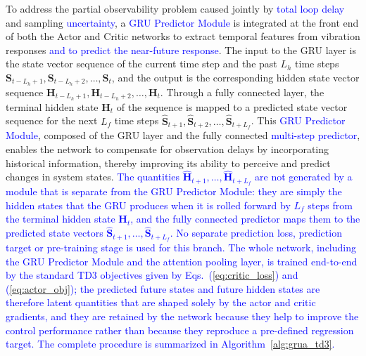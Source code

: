 \documentclass[review]{elsarticle}
\begin{document}
To address the partial observability problem caused jointly by \textcolor{blue}{total loop delay} and sampling \textcolor{blue}{uncertainty}, a \textcolor{blue}{GRU Predictor Module} is integrated at the front end of both the Actor and Critic networks to extract temporal features from vibration responses \textcolor{blue}{and to predict the near-future response}.
The input to the GRU layer is the state vector sequence of the current time step and the past $L_h$ time steps $\mathbf{S}_{t-L_h+1}, \mathbf{S}_{t-L_h+2}, \dots, \mathbf{S}_t$, and the output is the corresponding hidden state vector sequence $\mathbf{H}_{t-L_h+1}, \mathbf{H}_{t-L_h+2}, \dots, \mathbf{H}_t$.
Through a fully connected layer, the terminal hidden state $\mathbf{H}_t$ of the sequence is mapped to a predicted state vector sequence for the next $L_f$ time steps $\hat{\mathbf{S}}_{t+1}, \hat{\mathbf{S}}_{t+2}, \dots, \hat{\mathbf{S}}_{t+L_f}$.
This \textcolor{blue}{GRU Predictor Module}, composed of the GRU layer and the fully connected \textcolor{blue}{multi-step predictor}, enables the network to compensate for observation delays by incorporating historical information, thereby improving its ability to perceive and predict changes in system states.
\textcolor{blue}{The quantities $\hat{\mathbf{H}}_{t+1},\dots,\hat{\mathbf{H}}_{t+L_f}$ are not generated by a module that is separate from the GRU Predictor Module: they are simply the hidden states that the GRU produces when it is rolled forward by $L_f$ steps from the terminal hidden state $\mathbf{H}_t$, and the fully connected predictor maps them to the predicted state vectors $\hat{\mathbf{S}}_{t+1},\dots,\hat{\mathbf{S}}_{t+L_f}$. No separate prediction loss, prediction target or pre-training stage is used for this branch. The whole network, including the GRU Predictor Module and the attention pooling layer, is trained end-to-end by the standard TD3 objectives given by Eqs.~(\ref{eq:critic_loss}) and (\ref{eq:actor_obj}); the predicted future states and future hidden states are therefore latent quantities that are shaped solely by the actor and critic gradients, and they are retained by the network because they help to improve the control performance rather than because they reproduce a pre-defined regression target. The complete procedure is summarized in Algorithm~\ref{alg:grua_td3}.}
\end{document}
